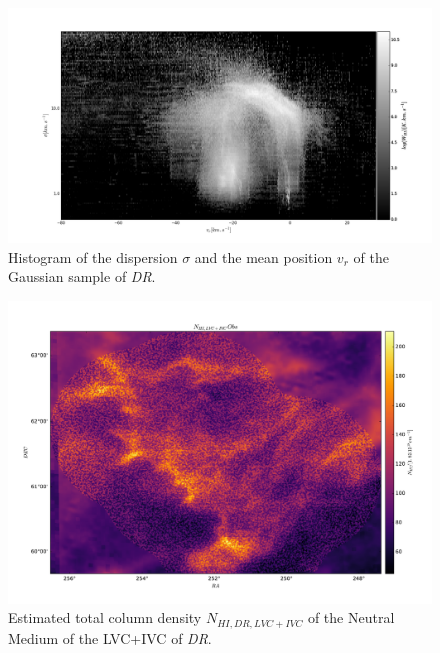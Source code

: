 \documentclass[traditabstract]{aa}
\begin{document}
\begin{figure}
   \includegraphics[width=\linewidth]{Figures/heatmap_png.png}
   \caption{Histogram of the dispersion $\sigma$ and the mean position $v_{r}$ of the Gaussian sample of \textit{DR}.}
   \label{fig::heatmap}
\end{figure}

\begin{figure}[h!]
   \includegraphics[width=\linewidth]{Figures/NHI_obs_DRAO.pdf}
   \caption{Estimated total column density $N_{HI, DR, LVC+IVC}$ of the Neutral Medium of the LVC+IVC of \textit{DR}.}
   \label{fig::NHI_obs_DRAO}
\end{figure}
\end{document}
